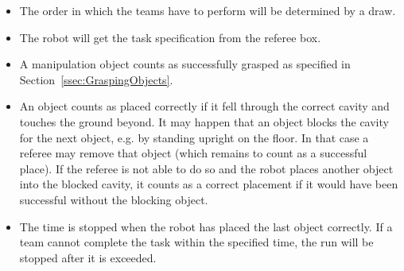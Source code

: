 \begin{itemize}

\item The order in which the teams have to perform will be determined by a draw.
\item The robot will get the task specification from the referee box.
\item A manipulation object counts as successfully grasped as specified in Section~\ref{ssec:GraspingObjects}.
\item An object counts as placed correctly if it fell through the correct cavity and touches the ground beyond. It may happen that an object blocks the cavity for the next object, e.g. by standing upright on the floor. In that case a referee may remove that object (which remains to count as a successful place). If the referee is not able to do so and the robot places another object into the blocked cavity, it counts as a correct placement if it would have been successful without the blocking object.
\item The time is stopped when the robot has placed the last object correctly. If a team cannot complete the task within the specified time, the run will be stopped after it is exceeded.  

\end{itemize}

%


